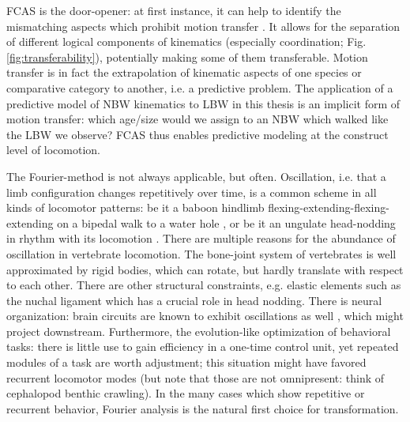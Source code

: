 FCAS is the door-opener: at first instance, it can help to identify the mismatching aspects which prohibit motion transfer \citep{Gatesy2011}.
It allows for the separation of different logical components of kinematics (especially coordination; Fig. \ref{fig:transferability}), potentially making some of them transferable.
Motion transfer is in fact the extrapolation of kinematic aspects of one species or comparative category to another, i.e. a predictive problem.
The application of a predictive model of NBW kinematics to LBW in this thesis is an implicit form of motion transfer: which age/size would we assign to an NBW which walked like the LBW we observe?
FCAS thus enables predictive modeling at the construct level of locomotion.

\bigskip
The Fourier-method is not always applicable, but often.
Oscillation, i.e. that a limb configuration changes repetitively over time, is a common scheme in all kinds of locomotor patterns: be it a baboon hindlimb flexing-extending-flexing-extending on a bipedal walk to a water hole \citep{Druelle2021}, or be it an ungulate head-nodding in rhythm with its locomotion \citep{Loscher2016}.
There are multiple reasons for the abundance of oscillation in vertebrate locomotion.
The bone-joint system of vertebrates is well approximated by rigid bodies, which can rotate, but hardly translate with respect to each other.
There are other structural constraints, e.g. elastic elements such as the nuchal ligament which has a crucial role in head nodding.
There is neural organization: brain circuits are known to exhibit oscillations as well \citep{Gupta2016}, which might project downstream.
Furthermore, the evolution-like optimization of behavioral tasks: there is little use to gain efficiency in a one-time control unit, yet repeated modules of a task are worth adjustment; this situation might have favored recurrent locomotor modes (but note that those are not omnipresent: think of cephalopod benthic crawling).
In the many cases which show repetitive or recurrent behavior, Fourier analysis is the natural first choice for transformation.
